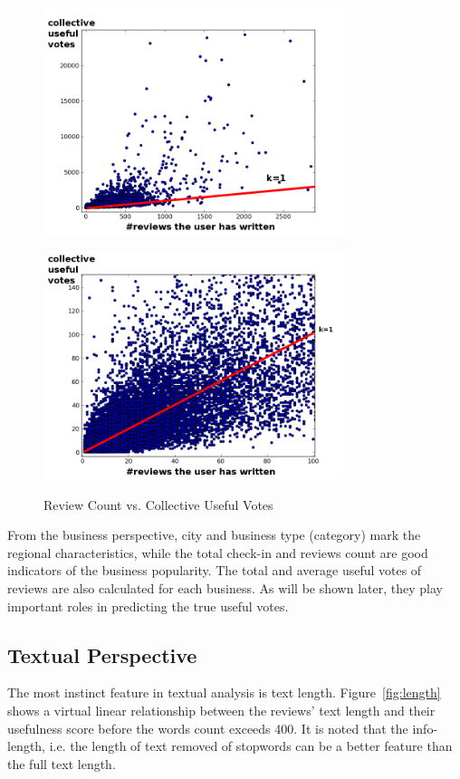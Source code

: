 \documentclass[a4paper,12pt,title]{article}
\begin{document}
\begin{figure}
\begin{minipage}[t]{0.5\linewidth}
\centering
\includegraphics[width=250pt]{graph/reviewcount2votes.png}
\label{fig:macro}
\end{minipage}
\begin{minipage}[t]{0.5\linewidth}
\centering
\includegraphics[width=250pt]{graph/reviewcount2votes_mic.png}
\label{fig:micro}
\end{minipage}
\caption{Review Count vs. Collective Useful Votes}
\label{fig:rvcount2vote}
\end{figure}

From the business perspective, city and business type (category) mark the regional characteristics, while the total check-in and reviews count are good indicators of the business popularity. The total and average useful votes of reviews are also calculated for each business. As will be shown later, they play important roles in predicting the true useful votes.

\subsection{Textual Perspective}
The most instinct feature in textual analysis is text length. Figure~\ref{fig:length} shows a virtual linear relationship between the reviews' text length and their usefulness score before the words count exceeds 400. It is noted that the info-length, i.e. the length of text removed of stopwords can be a better feature than the full text length.
\end{document}
